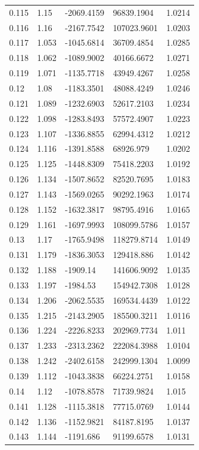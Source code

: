 \begin{tabular}{lllll}
0.115 & 1.15 & -2069.4159 & 96839.1904 & 1.0214 \\
0.116 & 1.16 & -2167.7542 & 107023.9601 & 1.0203 \\
0.117 & 1.053 & -1045.6814 & 36709.4854 & 1.0285 \\
0.118 & 1.062 & -1089.9002 & 40166.6672 & 1.0271 \\
0.119 & 1.071 & -1135.7718 & 43949.4267 & 1.0258 \\
0.12 & 1.08 & -1183.3501 & 48088.4249 & 1.0246 \\
0.121 & 1.089 & -1232.6903 & 52617.2103 & 1.0234 \\
0.122 & 1.098 & -1283.8493 & 57572.4907 & 1.0223 \\
0.123 & 1.107 & -1336.8855 & 62994.4312 & 1.0212 \\
0.124 & 1.116 & -1391.8588 & 68926.979 & 1.0202 \\
0.125 & 1.125 & -1448.8309 & 75418.2203 & 1.0192 \\
0.126 & 1.134 & -1507.8652 & 82520.7695 & 1.0183 \\
0.127 & 1.143 & -1569.0265 & 90292.1963 & 1.0174 \\
0.128 & 1.152 & -1632.3817 & 98795.4916 & 1.0165 \\
0.129 & 1.161 & -1697.9993 & 108099.5786 & 1.0157 \\
0.13 & 1.17 & -1765.9498 & 118279.8714 & 1.0149 \\
0.131 & 1.179 & -1836.3053 & 129418.886 & 1.0142 \\
0.132 & 1.188 & -1909.14 & 141606.9092 & 1.0135 \\
0.133 & 1.197 & -1984.53 & 154942.7308 & 1.0128 \\
0.134 & 1.206 & -2062.5535 & 169534.4439 & 1.0122 \\
0.135 & 1.215 & -2143.2905 & 185500.3211 & 1.0116 \\
0.136 & 1.224 & -2226.8233 & 202969.7734 & 1.011 \\
0.137 & 1.233 & -2313.2362 & 222084.3988 & 1.0104 \\
0.138 & 1.242 & -2402.6158 & 242999.1304 & 1.0099 \\
0.139 & 1.112 & -1043.3838 & 66224.2751 & 1.0158 \\
0.14 & 1.12 & -1078.8578 & 71739.9824 & 1.015 \\
0.141 & 1.128 & -1115.3818 & 77715.0769 & 1.0144 \\
0.142 & 1.136 & -1152.9821 & 84187.8195 & 1.0137 \\
0.143 & 1.144 & -1191.686 & 91199.6578 & 1.0131 \\

\end{tabular}
